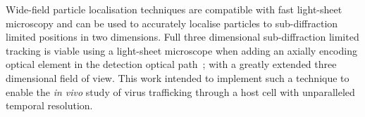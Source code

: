 Wide-field particle localisation techniques are compatible with fast \gls{light-sheet} microscopy and can be used to accurately localise particles to sub-diffraction limited positions in two dimensions.
Full three dimensional sub-diffraction limited tracking is viable using a \gls{light-sheet} microscope when adding an axially encoding optical element in the detection optical path~\cite{spille_direct_2015}; with a greatly extended three dimensional field of view.
This work intended to implement such a technique to
enable the \textit{in vivo} study of virus trafficking through a host cell with unparalleled temporal resolution.


